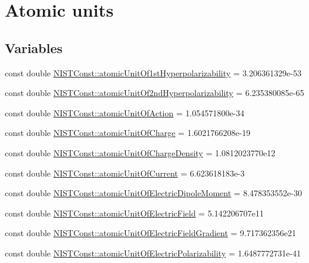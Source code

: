 \hypertarget{group___n_i_s_t_const-_atomic_unit}{}\section{Atomic units}
\label{group___n_i_s_t_const-_atomic_unit}
\subsection*{Variables}
\begin{DoxyCompactItemize}
\item 
const double \hyperlink{group___n_i_s_t_const-_atomic_unit_gaa43ceaed22f3b69aee64d117cae645fb}{N\+I\+S\+T\+Const\+::atomic\+Unit\+Of1st\+Hyperpolarizability} = 3.\+206361329e-\/53
\item 
const double \hyperlink{group___n_i_s_t_const-_atomic_unit_ga55b22fa50aa069b98aa1bcb050206a8e}{N\+I\+S\+T\+Const\+::atomic\+Unit\+Of2nd\+Hyperpolarizability} = 6.\+235380085e-\/65
\item 
const double \hyperlink{group___n_i_s_t_const-_atomic_unit_ga6685e215d87395646fc18e2efa30d7a0}{N\+I\+S\+T\+Const\+::atomic\+Unit\+Of\+Action} = 1.\+054571800e-\/34
\item 
const double \hyperlink{group___n_i_s_t_const-_atomic_unit_ga1a42bd5db581dc5bf7a87b864bc77cf4}{N\+I\+S\+T\+Const\+::atomic\+Unit\+Of\+Charge} = 1.\+6021766208e-\/19
\item 
const double \hyperlink{group___n_i_s_t_const-_atomic_unit_gaa1918065ee8731837afe6bddee194320}{N\+I\+S\+T\+Const\+::atomic\+Unit\+Of\+Charge\+Density} = 1.\+0812023770e12
\item 
const double \hyperlink{group___n_i_s_t_const-_atomic_unit_ga6d0f3cfc8aaa2aeb120559aaea2dc5c6}{N\+I\+S\+T\+Const\+::atomic\+Unit\+Of\+Current} = 6.\+623618183e-\/3
\item 
const double \hyperlink{group___n_i_s_t_const-_atomic_unit_ga108a8be4e32eddd7cdfdf4473f3532ab}{N\+I\+S\+T\+Const\+::atomic\+Unit\+Of\+Electric\+Dipole\+Moment} = 8.\+478353552e-\/30
\item 
const double \hyperlink{group___n_i_s_t_const-_atomic_unit_gab8b246e91a41cadb97f128210a6c81db}{N\+I\+S\+T\+Const\+::atomic\+Unit\+Of\+Electric\+Field} = 5.\+142206707e11
\item 
const double \hyperlink{group___n_i_s_t_const-_atomic_unit_ga45f55b90a26e2e96f00c2664ddd79f11}{N\+I\+S\+T\+Const\+::atomic\+Unit\+Of\+Electric\+Field\+Gradient} = 9.\+717362356e21
\item 
const double \hyperlink{group___n_i_s_t_const-_atomic_unit_ga5809393ec8d30cbb7e0c7a2f168e48ec}{N\+I\+S\+T\+Const\+::atomic\+Unit\+Of\+Electric\+Polarizability} = 1.\+6487772731e-\/41

\end{DoxyCompactItemize}

